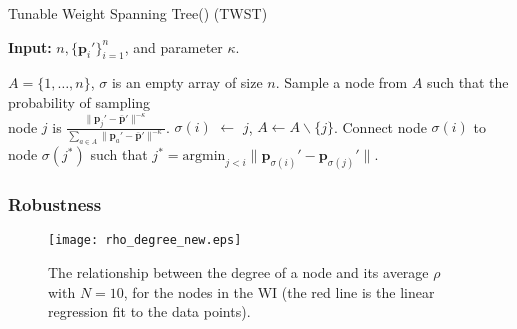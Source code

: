 \documentclass[10pt,journal]{IEEEtran}
\begin{document}
\begin{procedure}[t]
\footnotesize
\caption{Tunable Weight Spanning Tree() (TWST)}
\begin{trivlist}
\item\textbf{Input:} $n, \{\textbf{p}_i'\}_{i=1}^n$, and parameter $\kappa$.
\end{trivlist}
\vspace*{-3mm}
\begin{algorithmic}[1]
\STATE $A=\{1,\dots,n\}$, $\sigma$ is an empty array of size $n$.
 \label{step:for}
\STATE Sample a node from $A$ such that the probability of sampling \\node $j$ is $\frac{\|\textbf{p}_j'-\bar{\textbf{p}}'\|^{-\kappa}}{\sum_{a\in A}\|\textbf{p}_a'-\bar{\textbf{p}}'\|^{-\kappa}}$.
\STATE $\sigma(i)$ $\leftarrow$ $j$, $A\leftarrow A\backslash\{j\}$.
\ENDFOR
{}\label{step:for2}
\STATE Connect node $\sigma(i)$ to node $\sigma(j^*)$ such that $j^* = \text{argmin}_{j<i} \|\textbf{p}_{\sigma(i)}'-\textbf{p}_{\sigma(j)}'\|$.
\ENDFOR
\end{algorithmic}
\label{pro:span}
\end{procedure}

\subsubsection{Robustness}

\begin{figure}[t]
\centering
\vspace*{-0.2cm}
\texttt{[image: rho\_degree\_new.eps]}
\vspace*{-0.2cm}
\caption{The relationship between the degree of a node and its average $\rho$ with $N=10$, for the nodes in the WI
(the red line is the linear regression fit to the data points).}
\label{fig:rho_degree}
\vspace*{0.2cm}
\end{figure}
\end{document}
